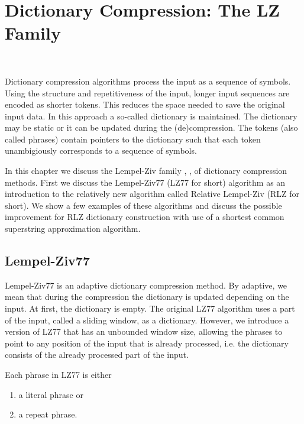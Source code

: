 \documentclass[english,twoside,censored,csm,algorithms-track-2020]{HYthesisML}
\theoremstyle{plain}
\theoremstyle{definition}
\begin{document}

\chapter{Dictionary Compression: The LZ Family}~\label{chp-rlz}

Dictionary compression algorithms \citep{Storer82} process the input as a sequence of symbols.
Using the structure and repetitiveness of the input, longer input sequences are encoded as shorter
tokens. This reduces the space needed to save the original input data. In this approach a so-called
dictionary is maintained. The dictionary may be static or it can be updated during the (de)compression.
The tokens (also called phrases) contain pointers to the dictionary such that each token
unambigiously corresponds to a sequence of symbols. \citep{Pu05} 

In this chapter we discuss the Lempel-Ziv family \citep{Ziv77}, \citep{Ziv78}, \citep{Welch84}
 of dictionary compression methods.
First we discuss the Lempel-Ziv77 (LZ77 for short) algorithm
\citep{Ziv77} as an introduction to the relatively new  algorithm called
Relative Lempel-Ziv \citep{Kurppu10} (RLZ for short). We show a few examples of these algorithms and
discuss the possible improvement for RLZ dictionary construction with use of a shortest common
superstring approximation algorithm.

\section{Lempel-Ziv77}

Lempel-Ziv77 is an adaptive dictionary compression method. By adaptive, we mean that during the
compression the dictionary is updated depending on the input. At first, the dictionary is empty. 
The original LZ77 algorithm uses a part of the input, called a sliding window, as a dictionary.
However, we introduce a version of LZ77 that has an unbounded window size, allowing the phrases
to point to any position of the input that is already processed, i.e. the dictionary consists of the
already processed part of the input.

Each phrase in LZ77 is either 
\begin{enumerate}
\item a literal phrase or
\item a repeat phrase.
\end{enumerate}
\end{document}
